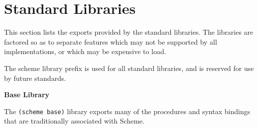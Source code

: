 \chapter{Standard Libraries}
\label{stdlibraries}


This section lists the exports provided by the standard libraries.  The
libraries are factored so as to separate features which may not be
supported by all implementations, or which may be expensive to load.

The {\cf scheme} library prefix is used for all standard libraries, and
is reserved for use by future standards.

\textbf{Base Library}

The \texttt{(scheme base)} library exports many of the procedures and
syntax bindings that are traditionally associated with Scheme.

